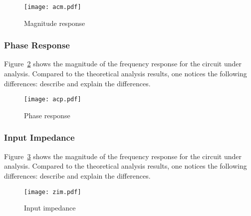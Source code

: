 \begin{figure}[H] \centering
\texttt{[image: acm.pdf]}
\caption{Magnitude response}
\label{fig:acm}
\end{figure}


\subsubsection{Phase Response}

Figure~\ref{fig:acp} shows the magnitude of the frequency response for the circuit under analysis. Compared to the theoretical analysis results, one notices the following differences: describe and explain the differences.

\begin{figure}[H] \centering
\texttt{[image: acp.pdf]}
\caption{Phase response}
\label{fig:acp}
\end{figure}

\subsubsection{Input Impedance}

Figure~\ref{fig:zim} shows the magnitude of the frequency response for the circuit under analysis. Compared to the theoretical analysis results, one notices the following differences: describe and explain the differences.

\begin{figure}[H] \centering
\texttt{[image: zim.pdf]}
\caption{Input impedance}
\label{fig:zim}
\end{figure}



